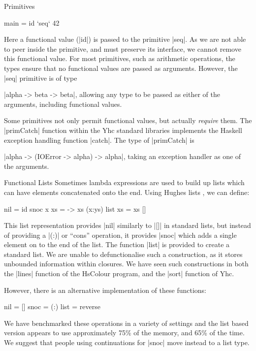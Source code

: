 \documentclass[preprint]{sigplanconf}
\begin{document}
\begin{examplename}{Primitives}
\begin{code}
main = id `seq` 42
\end{code}

Here a functional value (|id|) is passed to the primitive |seq|. As we are not able to peer inside the primitive, and must preserve its interface, we cannot remove this functional value. For most primitives, such as arithmetic operations, the types ensure that no functional values are passed as arguments. However, the |seq| primitive is of type \ignore|alpha -> beta -> beta|, allowing any type to be passed as either of the arguments, including functional values.

Some primitives not only permit functional values, but actually \textit{require} them. The |primCatch| function within the Yhc standard libraries implements the Haskell exception handling function |catch|. The type of |primCatch| is \ignore|alpha -> (IOError -> alpha) -> alpha|, taking an exception handler as one of the arguments.
\end{examplename}

\begin{examplename}{Functional Lists}
\label{ex:functional_lists}
Sometimes lambda expressions are used to build up lists which can have elements concatenated onto the end. Using Hughes lists \cite{hughes:lists}, we can define:

\begin{code}
nil = id
snoc x xs = \ys -> xs (x:ys)
list xs = xs []
\end{code}

This list representation provides |nil| similarly to |[]| in standard lists, but instead of providing a |(:)| or ``cons'' operation, it provides |snoc| which adds a single element on to the end of the list. The function |list| is provided to create a standard list. We are unable to defunctionalise such a construction, as it stores unbounded information within closures. We have seen such constructions in both the |lines| function of the HsColour program, and the |sort| function of Yhc.

However, there is an alternative implementation of these functions:

\begin{code}
nil = []
snoc = (:)
list = reverse
\end{code}

We have benchmarked these operations in a variety of settings and the list based version appears to use approximately 75\% of the memory, and 65\% of the time. We suggest that people using continuations for |snoc| move instead to a list type.
\end{examplename}
\end{document}
